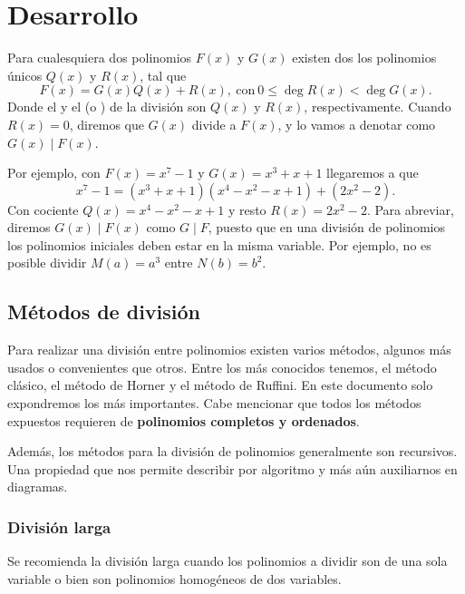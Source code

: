 \section{Desarrollo}

\begin{definition}
    Para cualesquiera dos polinomios $F(x)$ y $G(x)$ existen dos los polinomios únicos $Q(x)$ y $R(x)$, tal que
    \[
        F(x) = G(x)Q(x) + R(x),\ \text{con}\ 0 \leq \deg{R(x)} < \deg{G(x)}.
    \]
    Donde el  y el  (o ) de la división son $Q(x)$ y $R(x)$, respectivamente.
    Cuando $R(x) = 0$, diremos que $G(x)$ divide a $F(x)$, y lo vamos a denotar como $G(x) \mid F(x)$.
\end{definition}
Por ejemplo, con $F(x) = x^7 - 1$ y $G(x) = x^3 + x + 1$ llegaremos a que
\[
    x^7 - 1 = (x^3 + x + 1)(x^4 - x^2 - x + 1) + (2 x^2 - 2).
\]
Con cociente $Q(x) = x^4 - x^2 - x + 1$ y resto $R(x) = 2 x^2 - 2$.
Para abreviar, diremos $G(x) \mid F(x)$ como $G \mid F$, puesto que en una división de polinomios los polinomios iniciales deben estar en la misma variable.
Por ejemplo, no es posible dividir $M(a) = a^3$ entre $N(b) = b^2$.


\subsection{Métodos de división}

Para realizar una división entre polinomios existen varios métodos, algunos más usados o convenientes que otros.
Entre los más conocidos tenemos, el método clásico, el método de Horner y el método de Ruffini.
En este documento solo expondremos los más importantes.
Cabe mencionar que todos los métodos expuestos requieren de \textbf{polinomios completos y ordenados}.

Además, los métodos para la división de polinomios generalmente son recursivos.
Una propiedad que nos permite describir por algoritmo y más aún auxiliarnos en diagramas.

\subsubsection{División larga}

Se recomienda la división larga cuando los polinomios a dividir son de una sola variable o bien son polinomios homogéneos de dos variables.

